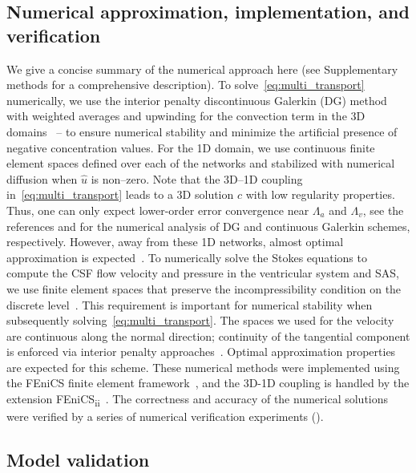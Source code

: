\documentclass[fleqn,10pt]{wlscirep}
\begin{document}
\subsection*{Numerical approximation, implementation, and verification}

We give a concise summary of the numerical approach here (see
Supplementary methods for a comprehensive description). To
solve~\eqref{eq:multi_transport} numerically, we use the interior
penalty discontinuous Galerkin (DG) method with weighted averages and
upwinding for the convection term in the 3D
domains~\cite{ern2009discontinuous} -- to ensure numerical stability
and minimize the artificial presence of negative concentration
values. For the 1D domain, we use continuous finite element spaces
defined over each of the networks and stabilized with numerical
diffusion when $\hat{u}$ is non--zero. Note that the 3D--1D coupling
in~\eqref{eq:multi_transport} leads to a 3D solution $c$ with low
regularity properties. Thus, one can only expect lower-order error
convergence near $\Lambda_a$ and $\Lambda_v$, see the references
\cite{masri2024discontinuous} and \cite{laurino2019derivation} for the
numerical analysis of DG and continuous Galerkin schemes,
respectively. However, away from these 1D networks, almost optimal
approximation is
expected~\cite{masri2023discontinuous,koppl2016local}. To numerically
solve the Stokes equations to compute the CSF flow velocity and
pressure in the ventricular system and SAS, we use finite element
spaces that preserve the incompressibility condition on the discrete
level~\cite{hong2016robust}. This requirement is important for
numerical stability when subsequently
solving~\eqref{eq:multi_transport}\cite{cesmelioglu2022compatible}.
The spaces we used for the velocity are continuous along the normal
direction; continuity of the tangential component is enforced via
interior penalty approaches~\cite{hong2016robust}. Optimal
approximation properties are expected for this scheme. These numerical
methods were implemented using the FEniCS finite element
framework~\cite{alnaes2015fenics}, and the 3D-1D coupling is handled
by the extension
FEniCS\textsubscript{ii}~\cite{kuchta2020assembly}. The correctness
and accuracy of the numerical solutions were verified by a series of
numerical verification experiments ().

\subsection*{Model validation}
\end{document}

